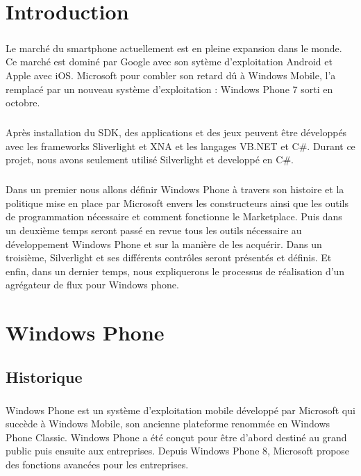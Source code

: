 \documentclass[twoside,UTF8]{EPURapport}
\begin{document}
\chapter{Introduction}

\paragraph{}
Le marché du smartphone  actuellement est en pleine expansion dans le monde. Ce marché est dominé par Google avec son sytème d'exploitation Android et Apple avec iOS. Microsoft pour combler son retard dû à Windows Mobile, l'a remplacé par un nouveau système d'exploitation : Windows Phone 7 sorti en octobre. 

\paragraph{}
Après installation du SDK, des applications et des jeux peuvent être développés avec les frameworks Sliverlight et XNA et les langages VB.NET et C$\#$. Durant ce projet, nous avons seulement utilisé Silverlight et developpé en C$\#$. 

\paragraph{}
Dans un premier nous allons définir Windows Phone à travers son histoire et la politique mise en place par Microsoft envers les constructeurs ainsi que les outils de programmation nécessaire et comment fonctionne le Marketplace. Puis dans un deuxième temps seront passé en revue tous les outils nécessaire au développement Windows Phone et sur la manière de les acquérir. Dans un troisième, Silverlight et ses différents contrôles seront présentés et définis. Et enfin, dans un dernier temps, nous expliquerons le processus de réalisation d'un agrégateur de flux pour Windows phone.


\chapter{Windows Phone}
\section{Historique}

\paragraph{}
Windows Phone est un système d'exploitation mobile développé par Microsoft qui succède à Windows Mobile, son ancienne plateforme renommée en Windows Phone Classic. Windows Phone a été conçut pour être d'abord destiné au grand public puis ensuite aux entreprises. Depuis Windows Phone 8, Microsoft propose des fonctions avancées pour les entreprises.
\end{document}
